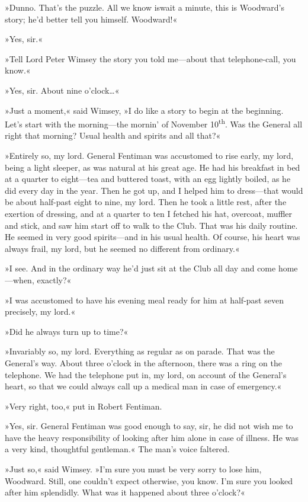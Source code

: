»Dunno. That's the puzzle. All we know is\textellipsis  wait a minute, this is Woodward's story; he'd better tell you himself. Woodward!«

»Yes, sir.«

»Tell Lord Peter Wimsey the story you told me—about that telephone-call, you know.«

»Yes, sir. About nine o'clock\dots«

»Just a moment,« said Wimsey, »I do like a story to begin at the beginning. Let's start with the morning—the mornin' of November  10\textsuperscript{th}. Was the General all right that morning? Usual health and spirits and all that?«

»Entirely so, my lord. General Fentiman was accustomed to rise early, my lord, being a light sleeper, as was natural at his great age. He had his breakfast in bed at a quarter to eight—tea and buttered toast, with an egg lightly boiled, as he did every day in the year. Then he got up, and I helped him to dress—that would be about half-past eight to nine, my lord. Then he took a little rest, after the exertion of dressing, and at a quarter to ten I fetched his hat, overcoat, muffler and stick, and saw him start off to walk to the Club. That was his daily routine. He seemed in very good spirits—and in his usual health. Of course, his heart was always frail, my lord, but he seemed no different from ordinary.«

»I see. And in the ordinary way he'd just sit at the Club all day and come home—when, exactly?«

»I was accustomed to have his evening meal ready for him at half-past seven precisely, my lord.«

»Did he always turn up to time?«

»Invariably so, my lord. Everything as regular as on parade. That was the General's way. About three o'clock in the afternoon, there was a ring on the telephone. We had the telephone put in, my lord, on account of the General's heart, so that we could always call up a medical man in case of emergency.«

»Very right, too,« put in Robert Fentiman.

»Yes, sir. General Fentiman was good enough to say, sir, he did not wish me to have the heavy responsibility of looking after him alone in case of illness. He was a very kind, thoughtful gentleman.« The man's voice faltered.

»Just so,« said Wimsey. »I'm sure you must be very sorry to lose him, Woodward. Still, one couldn't expect otherwise, you know. I'm sure you looked after him splendidly. What was it happened about three o'clock?«

